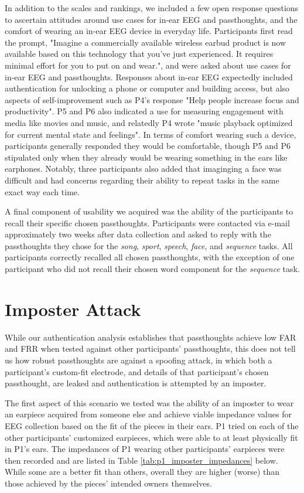 \documentclass{sigchi}
\begin{document}
In addition to the scales and rankings, we included a few open response questions to ascertain attitudes around use cases for in-ear EEG and passthoughts, and the comfort of wearing an in-ear EEG device in everyday life. Participants first read the prompt, "Imagine a commercially available wireless earbud product is now available based on this technology that you've just experienced. It requires minimal effort for you to put on and wear.", and were asked about use cases for in-ear EEG and passthoughts. Responses about in-ear EEG expectedly included authentication for unlocking a phone or computer and building access, but also aspects of self-improvement such as P4's response "Help people increase focus and productivity". P5 and P6 also indicated a use for measuring engagement with media like movies and music, and relatedly P4 wrote "music playback optimized for current mental state and feelings". In terms of comfort wearing such a device, participants generally responded they would be comfortable, though P5 and P6 stipulated only when they already would be wearing something in the ears like earphones. Notably, three participants also added that imaginging a face was difficult and had concerns regarding their ability to repeat tasks in the same exact way each time.

A final component of usability we acquired was the ability of the participants to recall their specific chosen passthoughts. Participants were contacted via e-mail approximately two weeks after data collection and asked to reply with the passthoughts they chose for the \textit{song}, \textit{sport}, \textit{speech}, \textit{face}, and \textit{sequence} tasks. All participants correctly recalled all chosen passthoughts, with the exception of one participant who did not recall their chosen word component for the \textit{sequence} task. 

\section{Imposter Attack}

While our authentication analysis establishes that passthoughts achieve low FAR and FRR when tested against other participants' passthoughts, this does not tell us how robust passthoughts are against a spoofing attack, in which both a participant's custom-fit electrode, and details of that participant's chosen passthought, are leaked and authentication is attempted by an imposter. 

The first aspect of this scenario we tested was the ability of an imposter to wear an earpiece acquired from someone else and achieve viable impedance values for EEG collection based on the fit of the pieces in their ears. P1 tried on each of the other participants' customized earpieces, which were able to at least physically fit in P1's ears. The impedances of P1 wearing other participants' earpieces were then recorded and are listed in Table \ref{tab:p1_imposter_impedances} below. While some are a better fit than others, overall they are higher (worse) than those achieved by the pieces' intended owners themselves.
\end{document}
